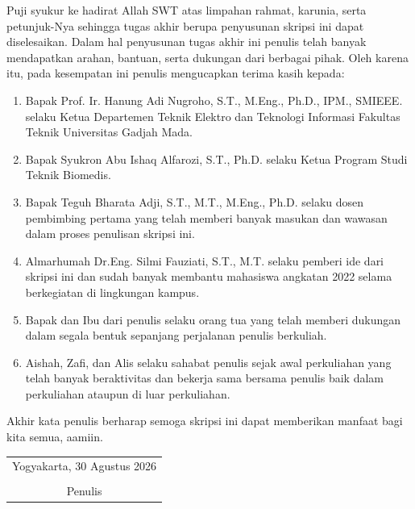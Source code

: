 Puji syukur ke hadirat Allah SWT atas limpahan rahmat, karunia, serta petunjuk-Nya sehingga tugas akhir berupa penyusunan skripsi ini dapat diselesaikan. Dalam hal penyusunan tugas akhir ini penulis telah banyak mendapatkan arahan, bantuan, serta dukungan dari berbagai pihak. Oleh karena itu, pada kesempatan ini penulis mengucapkan terima kasih kepada:


\begin{enumerate}
	\item Bapak Prof. Ir. Hanung Adi Nugroho, S.T., M.Eng., Ph.D., IPM., SMIEEE. selaku Ketua Departemen Teknik Elektro dan Teknologi Informasi Fakultas Teknik Universitas Gadjah Mada.
	
	\item Bapak Syukron Abu Ishaq Alfarozi, S.T., Ph.D. selaku Ketua Program Studi Teknik Biomedis.
	
	\item Bapak Teguh Bharata Adji, S.T., M.T., M.Eng., Ph.D. selaku dosen pembimbing pertama yang telah memberi banyak masukan dan wawasan dalam proses penulisan skripsi ini.
	
	\item Almarhumah Dr.Eng. Silmi Fauziati, S.T., M.T. selaku pemberi ide dari skripsi ini dan sudah banyak membantu mahasiswa angkatan 2022 selama berkegiatan di lingkungan kampus.
		
	\item Bapak dan Ibu dari penulis selaku orang tua yang telah memberi dukungan dalam segala bentuk sepanjang perjalanan penulis berkuliah.

	\item Aishah, Zafi, dan Alis selaku sahabat penulis sejak awal perkuliahan yang telah banyak beraktivitas dan bekerja sama bersama penulis baik dalam perkuliahan ataupun di luar perkuliahan.

\end{enumerate}

Akhir kata penulis berharap semoga skripsi ini dapat memberikan manfaat bagi kita semua, aamiin.

\begin{flushright}
	\begin{tabular}{c}
		Yogyakarta, 30 Agustus 2026 \\
		\vspace{1cm} \\
		Penulis
	\end{tabular}
\end{flushright}